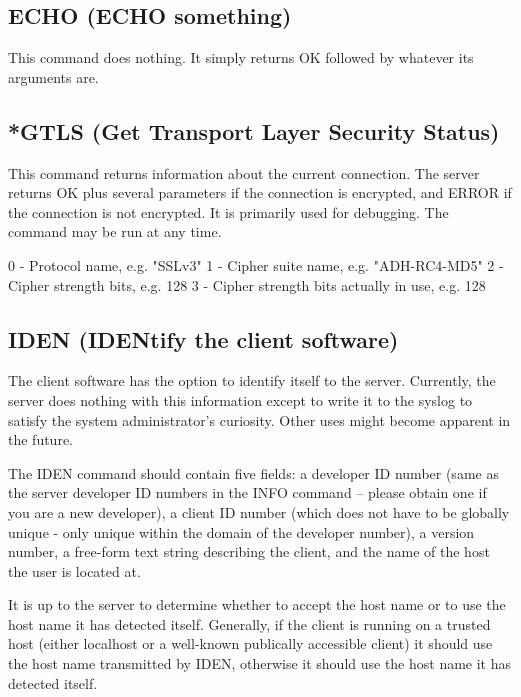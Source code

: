 \subsection{ECHO (ECHO something)}

 This command does nothing.  It simply returns OK followed by whatever
its arguments are.



\subsection{*GTLS (Get Transport Layer Security Status)}

 This command returns information about the current connection.  The server
returns OK plus several parameters if the connection is encrypted, and ERROR
if the connection is not encrypted.  It is primarily used for debugging.  The
command may be run at any time.

 0 - Protocol name, e.g. "SSLv3"
 1 - Cipher suite name, e.g. "ADH-RC4-MD5"
 2 - Cipher strength bits, e.g. 128
 3 - Cipher strength bits actually in use, e.g. 128



\subsection{IDEN (IDENtify the client software)}

 The client software has the option to identify itself to the server.
Currently, the server does nothing with this information except to write
it to the syslog to satisfy the system administrator's curiosity.  Other
uses might become apparent in the future.

 The IDEN command should contain five fields: a developer ID number (same as
the server developer ID numbers in the INFO command -- please obtain one if
you are a new developer), a client ID number (which does not have to be
globally unique - only unique within the domain of the developer number),
a version number, a free-form text string describing the client, and the name
of the host the user is located at.

 It is up to the server to determine whether to accept the host name or to
use the host name it has detected itself.  Generally, if the client is
running on a trusted host (either localhost or a well-known publically
accessible client) it should use the host name transmitted by IDEN,
otherwise it should use the host name it has detected itself.

